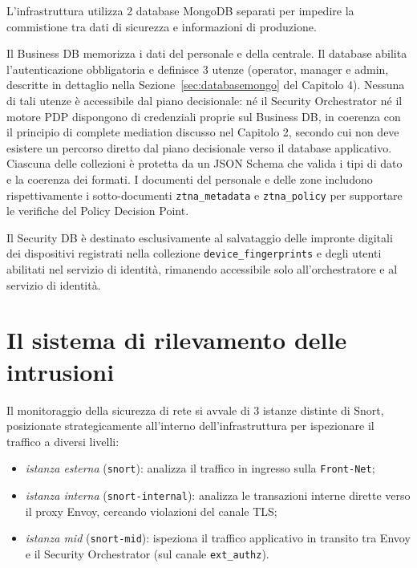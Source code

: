 L'infrastruttura utilizza 2 database MongoDB separati per impedire la commistione tra dati di sicurezza e informazioni di produzione.

Il Business DB memorizza i dati del personale e della centrale. Il database abilita l'autenticazione obbligatoria e definisce 3 utenze (operator, manager e admin, descritte in dettaglio nella Sezione~\ref{sec:databasemongo} del Capitolo 4). Nessuna di tali utenze è accessibile dal piano decisionale: né il Security Orchestrator né il motore PDP dispongono di credenziali proprie sul Business DB, in coerenza con il principio di complete mediation discusso nel Capitolo 2, secondo cui non deve esistere un percorso diretto dal piano decisionale verso il database applicativo. Ciascuna delle  collezioni è protetta da un JSON Schema che valida i tipi di dato e la coerenza dei formati. I documenti del personale e delle zone includono rispettivamente i sotto-documenti \texttt{ztna\_metadata} e \texttt{ztna\_policy} per supportare le verifiche del Policy Decision Point.

Il Security DB è destinato esclusivamente al salvataggio delle impronte digitali dei dispositivi registrati nella collezione \texttt{device\_fingerprints} e degli utenti abilitati nel servizio di identità, rimanendo accessibile solo all'orchestratore e al servizio di identità.

\section{Il sistema di rilevamento delle intrusioni}

Il monitoraggio della sicurezza di rete si avvale di 3 istanze distinte di Snort, posizionate strategicamente all'interno dell'infrastruttura per ispezionare il traffico a diversi livelli:

\begin{itemize}
    \item \textit{istanza esterna} (\texttt{snort}): analizza il traffico in ingresso sulla \texttt{Front-Net};
    \item \textit{istanza interna} (\texttt{snort-internal}): analizza le transazioni interne dirette verso il proxy Envoy, cercando violazioni del canale TLS;
    \item \textit{istanza mid} (\texttt{snort-mid}): ispeziona il traffico applicativo in transito tra Envoy e il Security Orchestrator (sul canale \texttt{ext\_authz}).
\end{itemize}

